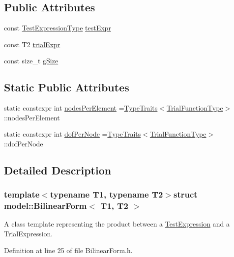 \subsection*{Public Attributes}
\begin{DoxyCompactItemize}
\item 
const \hyperlink{structmodel_1_1_bilinear_form_a9283d1ee67b9315a45ee36453e74f1e2}{Test\+Expression\+Type} \hyperlink{structmodel_1_1_bilinear_form_ae2986c81a6969d33947a1513c4047172}{test\+Expr}
\item 
const T2 \hyperlink{structmodel_1_1_bilinear_form_a91346cbd893511a5fe75ef0198e757f1}{trial\+Expr}
\item 
const size\+\_\+t \hyperlink{structmodel_1_1_bilinear_form_aa8655c3e338a766139318d3b408620c9}{g\+Size}
\end{DoxyCompactItemize}
\subsection*{Static Public Attributes}
\begin{DoxyCompactItemize}
\item 
static constexpr int \hyperlink{structmodel_1_1_bilinear_form_aee5498daed34f6d94709b6593b1ca695}{nodes\+Per\+Element} =\hyperlink{structmodel_1_1_type_traits}{Type\+Traits}$<$\hyperlink{structmodel_1_1_bilinear_form_acdc65f00a3d62200e21387bdbbb6eedd}{Trial\+Function\+Type}$>$\+::nodes\+Per\+Element
\item 
static constexpr int \hyperlink{structmodel_1_1_bilinear_form_a7bcebed645c29aaac2af31f6cd473f7c}{dof\+Per\+Node} =\hyperlink{structmodel_1_1_type_traits}{Type\+Traits}$<$\hyperlink{structmodel_1_1_bilinear_form_acdc65f00a3d62200e21387bdbbb6eedd}{Trial\+Function\+Type}$>$\+::dof\+Per\+Node
\end{DoxyCompactItemize}


\subsection{Detailed Description}
\subsubsection*{template$<$typename T1, typename T2$>$struct model\+::\+Bilinear\+Form$<$ T1, T2 $>$}

A class template representing the product between a \hyperlink{structmodel_1_1_test_expression}{Test\+Expression} and a Trial\+Expression. 

Definition at line 25 of file Bilinear\+Form.\+h.



